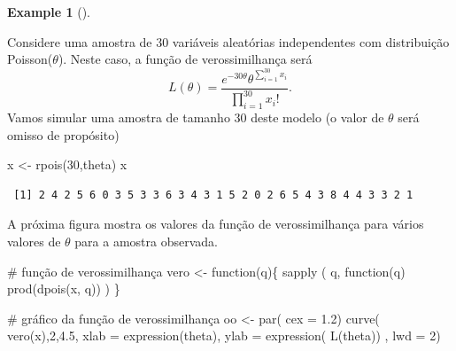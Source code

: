 \documentclass[
  letterpaper,
  DIV=11,
  numbers=noendperiod]{scrreprt}
\newenvironment{Shaded}{\begin{snugshade}}{\end{snugshade}}
\newcommand{\AttributeTok}[1]{\textcolor[rgb]{0.40,0.45,0.13}{#1}}
\newcommand{\CommentTok}[1]{\textcolor[rgb]{0.37,0.37,0.37}{#1}}
\newcommand{\ControlFlowTok}[1]{\textcolor[rgb]{0.00,0.23,0.31}{#1}}
\newcommand{\DecValTok}[1]{\textcolor[rgb]{0.68,0.00,0.00}{#1}}
\newcommand{\FloatTok}[1]{\textcolor[rgb]{0.68,0.00,0.00}{#1}}
\newcommand{\FunctionTok}[1]{\textcolor[rgb]{0.28,0.35,0.67}{#1}}
\newcommand{\NormalTok}[1]{\textcolor[rgb]{0.00,0.23,0.31}{#1}}
\newcommand{\OtherTok}[1]{\textcolor[rgb]{0.00,0.23,0.31}{#1}}
\theoremstyle{definition}
\newtheorem{example}{Example}[chapter]
\theoremstyle{definition}
\theoremstyle{remark}
\begin{document}
\begin{example}[]\protect\hypertarget{exm-}{}\label{exm-}

Considere uma amostra de 30 variáveis aleatórias independentes com
distribuição Poisson(\(\theta\)). Neste caso, a função de
verossimilhança será
\[L(\theta)=\frac{e^{-30\theta}\theta^{\sum_{i=1}^{30}x_i}}{\prod_{i=1}^{30}x_i!}.\]
Vamos simular uma amostra de tamanho 30 deste modelo (o valor de
\(\theta\) será omisso de propósito)

\begin{Shaded}
\begin{Highlighting}[]
\NormalTok{x }\OtherTok{\textless{}{-}} \FunctionTok{rpois}\NormalTok{(}\DecValTok{30}\NormalTok{,theta)}
\NormalTok{x}
\end{Highlighting}
\end{Shaded}

\begin{verbatim}
 [1] 2 4 2 5 6 0 3 5 3 3 6 3 4 3 1 5 2 0 2 6 5 4 3 8 4 4 3 3 2 1
\end{verbatim}

A próxima figura mostra os valores da função de verossimilhança para
vários valores de \(\theta\) para a amostra observada.

\begin{Shaded}
\begin{Highlighting}[]
\CommentTok{\# função de verossimilhança}
\NormalTok{vero }\OtherTok{\textless{}{-}} \ControlFlowTok{function}\NormalTok{(q)\{}
  \FunctionTok{sapply}\NormalTok{ ( q, }\ControlFlowTok{function}\NormalTok{(q) }\FunctionTok{prod}\NormalTok{(}\FunctionTok{dpois}\NormalTok{(x, q)) ) }
\NormalTok{\} }

\CommentTok{\# gráfico da função de verossimilhança}
\NormalTok{oo }\OtherTok{\textless{}{-}} \FunctionTok{par}\NormalTok{( }\AttributeTok{cex =} \FloatTok{1.2}\NormalTok{)}
\FunctionTok{curve}\NormalTok{( }\FunctionTok{vero}\NormalTok{(x),}\DecValTok{2}\NormalTok{,}\FloatTok{4.5}\NormalTok{, }\AttributeTok{xlab =} \FunctionTok{expression}\NormalTok{(theta), }\AttributeTok{ylab =} \FunctionTok{expression}\NormalTok{( }\FunctionTok{L}\NormalTok{(theta)) , }\AttributeTok{lwd =} \DecValTok{2}\NormalTok{)}
\end{Highlighting}
\end{Shaded}

\begin{figure}[H]


\end{figure}
\end{example}
\end{document}
